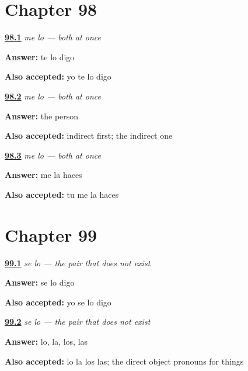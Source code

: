 \section*{Chapter 98}

\noindent\begin{minipage}[t]{\linewidth}
\raggedright
\hyperlink{review-ES-C47-me-lo-say}{\textbf{98.1}} \emph{me lo — both at once}\par
\small \textbf{Answer:} te lo digo\par
\footnotesize \textbf{Also accepted:} yo te lo digo
\end{minipage}\par\medskip

\noindent\begin{minipage}[t]{\linewidth}
\raggedright
\hyperlink{review-ES-C47-me-lo-order}{\textbf{98.2}} \emph{me lo — both at once}\par
\small \textbf{Answer:} the person\par
\footnotesize \textbf{Also accepted:} indirect first; the indirect one
\end{minipage}\par\medskip

\noindent\begin{minipage}[t]{\linewidth}
\raggedright
\hyperlink{review-ES-C47-me-lo-meal}{\textbf{98.3}} \emph{me lo — both at once}\par
\small \textbf{Answer:} me la haces\par
\footnotesize \textbf{Also accepted:} tu me la haces
\end{minipage}\par\medskip

\section*{Chapter 99}

\noindent\begin{minipage}[t]{\linewidth}
\raggedright
\hyperlink{review-ES-C47-se-lo-say}{\textbf{99.1}} \emph{se lo — the pair that does not exist}\par
\small \textbf{Answer:} se lo digo\par
\footnotesize \textbf{Also accepted:} yo se lo digo
\end{minipage}\par\medskip

\noindent\begin{minipage}[t]{\linewidth}
\raggedright
\hyperlink{review-ES-C47-se-lo-when}{\textbf{99.2}} \emph{se lo — the pair that does not exist}\par
\small \textbf{Answer:} lo, la, los, las\par
\footnotesize \textbf{Also accepted:} lo la los las; the direct object pronouns for things
\end{minipage}\par\medskip

